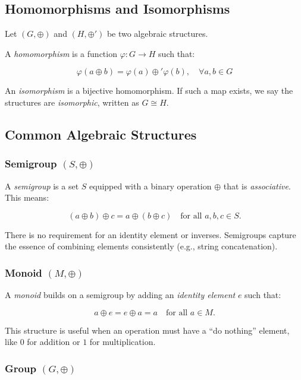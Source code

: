 \subsection{Homomorphisms and Isomorphisms}

Let \((G, \oplus)\) and \((H, \oplus')\) be two algebraic structures.

A \emph{homomorphism} is a function \(\varphi: G \rightarrow H\) such that:
    
\[
  \varphi(a \oplus b) = \varphi(a) \oplus' \varphi(b), \quad \forall a,b \in G
\]
    
An \emph{isomorphism} is a bijective homomorphism. If such a map exists, we say the structures are \emph{isomorphic}, written as \(G \cong H\).

\subsection{Common Algebraic Structures}

\subsubsection{Semigroup \texorpdfstring{\((S, \oplus)\)}{}}

A \emph{semigroup} is a set \(S\) equipped with a binary operation \(\oplus\) that is \emph{associative}. This means:

\[
    (a \oplus b) \oplus c = a \oplus (b \oplus c) \quad \text{for all } a, b, c \in S.
\]

There is no requirement for an identity element or inverses. Semigroups 
capture the essence of combining elements consistently (e.g., string concatenation).

\subsubsection{Monoid \texorpdfstring{\((M, \oplus)\)}{}}

A \emph{monoid} builds on a semigroup by adding an \emph{identity element} \(e\) such that:

\[
    a \oplus e = e \oplus a = a \quad \text{for all } a \in M.
\]

This structure is useful when an operation must have a “do nothing” element, like \(0\) for addition or \(1\) for multiplication.

\subsubsection{Group \texorpdfstring{\((G, \oplus)\)}{}}

